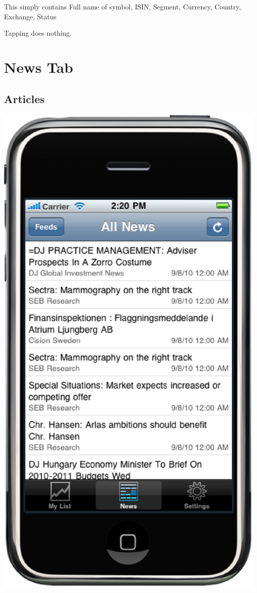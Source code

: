 \documentclass[12pt,twoside,letterpaper]{report}
\begin{document}
This simply contains Full name of symbol, ISIN, Segment, Currency, Country, Exchange, Status

Tapping does nothing.

\section*{News Tab}
\subsection*{Articles}
\includegraphics[scale=0.5]{newsArticles}
\end{document}
